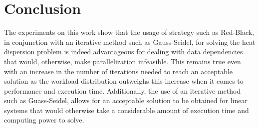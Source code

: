 \documentclass{article}
\begin{document}
\section{Conclusion}
The experiments on this work show that the usage of strategy such as Red-Black, in conjunction with an iterative method such as Gauss-Seidel, for solving 
the heat dispersion problem is indeed advantageous for dealing with data dependencies that would, otherwise, make parallelization infeasible.
This remains true even with an increase in the number of iterations needed to reach an acceptable solution as the workload distribution outweighs
this increase when it comes to performance and execution time.
Additionally, the use of an iterative method such as Guass-Seidel, allows for an acceptable solution to be obtained for linear systems that would 
otherwise take a considerable amount of execution time and computing power to solve.

\printbibliography
\end{document}
